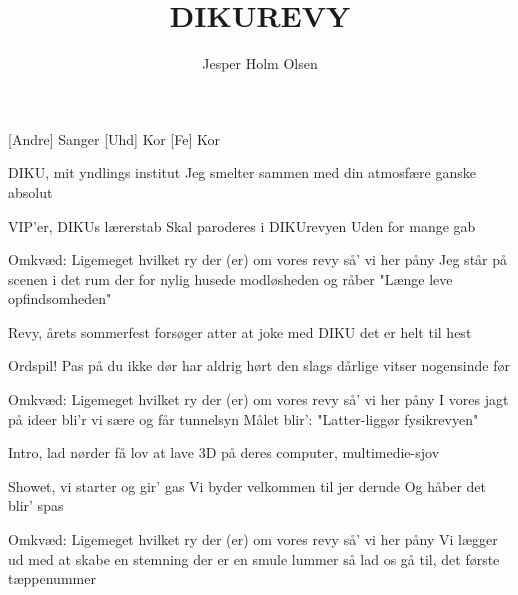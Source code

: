\documentclass[a4paper,12pt]{article}
\title{DIKUREVY}
\author{Jesper Holm Olsen}
\begin{document}
\maketitle

\begin{roles}
  [Andre] Sanger
  [Uhd] Kor
  [Fe] Kor
\end{roles}

\begin{song}
 DIKU, mit yndlings institut
Jeg smelter sammen med din atmosfære
ganske absolut

VIP'er, DIKUs lærerstab
Skal paroderes i DIKUrevyen
Uden for mange gab

Omkvæd:
Ligemeget hvilket ry
der (er) om vores revy
så' vi her påny
Jeg står på scenen i det rum
der for nylig husede modløsheden
og råber "Længe leve opfindsomheden"

Revy, årets sommerfest
forsøger atter at joke med DIKU
det er helt til hest

Ordspil! Pas på du ikke dør
har aldrig hørt den slags dårlige vitser
nogensinde før 

Omkvæd:
Ligemeget hvilket ry
der (er) om vores revy
så' vi her påny
I vores jagt på ideer
bli'r vi sære og får tunnelsyn
Målet blir': "Latter-liggør fysikrevyen"

Intro, lad nørder få lov
at lave 3D på deres computer,
multimedie-sjov

Showet, vi starter og gir' gas
Vi byder velkommen til jer derude
Og håber det blir' spas

Omkvæd:
Ligemeget hvilket ry
der (er) om vores revy
så' vi her påny
Vi lægger ud med at skabe
en stemning der er en smule lummer
så lad os gå til, det første tæppenummer 
 


\end{song}
\end{document}
